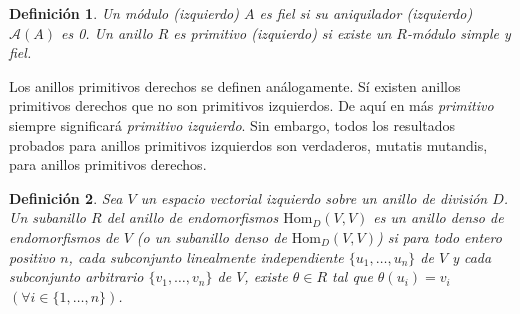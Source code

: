 \documentclass{report}
\newcommand{\Hom}{\text{Hom}}
\newtheorem{definition}{Definición}
\begin{document}
  \begin{definition}
    Un módulo (izquierdo) \(A\) es \emph{fiel} si su aniquilador (izquierdo) \(\mathcal{A}(A)\) es 0.
    Un anillo \(R\) es \emph{primitivo} (\emph{izquierdo}) si existe un \(R\)-módulo simple y fiel.
  \end{definition}

  Los anillos primitivos derechos se definen análogamente.
  Sí existen anillos primitivos derechos que no son primitivos izquierdos.
  De aquí en más \emph{primitivo} siempre significará \emph{primitivo izquierdo}.
  Sin embargo, todos los resultados probados para anillos primitivos izquierdos son verdaderos, mutatis mutandis, para anillos primitivos derechos.

  \begin{definition}
    Sea \(V\) un espacio vectorial izquierdo sobre un anillo de división \(D\).
    Un subanillo \(R\) del anillo de endomorfismos \(\Hom_D(V, V)\) es un \emph{anillo denso de endomorfismos} de \(V\) (o un \emph{subanillo denso} de \(\Hom_D(V, V)\)) si para todo entero positivo \(n\), cada subconjunto linealmente independiente \(\{u_1, \dots, u_n\}\) de \(V\) y cada subconjunto arbitrario \(\{v_1, \dots, v_n\}\) de \(V\), existe \(\theta \in R\) tal que \(\theta(u_i) = v_i\) \((\forall i \in \{1, \dots, n\})\).
  \end{definition}
\end{document}
